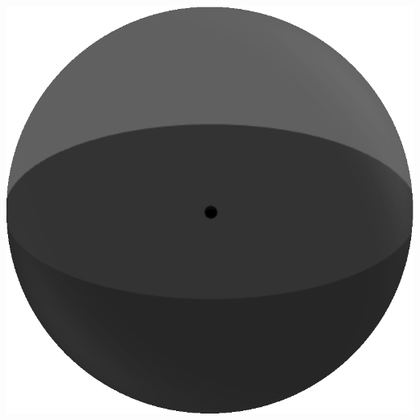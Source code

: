 \documentclass[compress,10pt,aspectratio=169]{beamer}
\begin{document}
\begin{frame}
\begin{columns}
\begin{column}{0.45\textwidth}
        \hspace{0.2cm}
        \includegraphics[scale=0.23]{images/sphere.eps}
        \vspace{0.3cm}
    \end{column}
\end{columns}
\end{frame}
\end{document}

